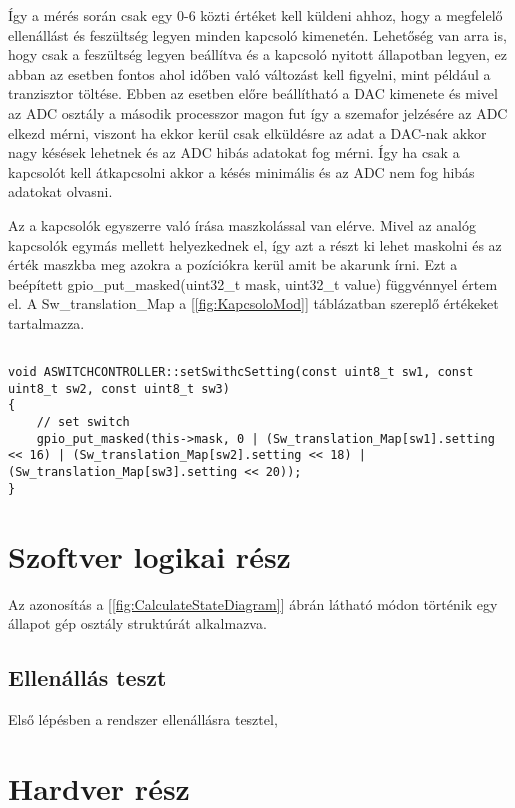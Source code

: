 Így a mérés során csak egy 0-6 közti értéket kell küldeni 
ahhoz, hogy a megfelelő ellenállást és feszültség legyen
minden kapcsoló kimenetén. Lehetőség van arra is, hogy csak 
a feszültség legyen beállítva és a kapcsoló nyitott állapotban legyen,
ez abban az esetben fontos ahol időben való változást kell figyelni,
mint például a tranzisztor töltése. Ebben az esetben előre 
beállítható a DAC kimenete és mivel az ADC osztály a második
processzor magon fut így a szemafor jelzésére az ADC elkezd mérni, 
viszont ha ekkor kerül csak elküldésre az adat a DAC-nak akkor 
nagy késések lehetnek és az ADC hibás adatokat fog mérni.
Így ha csak a kapcsolót kell átkapcsolni akkor a késés minimális és az ADC
nem fog hibás adatokat olvasni.

Az a kapcsolók egyszerre való írása maszkolással van elérve. Mivel az 
analóg kapcsolók egymás mellett helyezkednek el, így azt a 
részt ki lehet maskolni és az érték maszkba meg azokra a pozíciókra
kerül amit be akarunk írni. Ezt a beépített gpio_put_masked(uint32_t mask, uint32_t value)
függvénnyel értem el. A Sw_translation_Map a [\ref{fig:KapcsoloMod}] táblázatban
szereplő értékeket tartalmazza.


\begin{lstlisting}

void ASWITCHCONTROLLER::setSwithcSetting(const uint8_t sw1, const uint8_t sw2, const uint8_t sw3)
{
    // set switch
    gpio_put_masked(this->mask, 0 | (Sw_translation_Map[sw1].setting << 16) | (Sw_translation_Map[sw2].setting << 18) | (Sw_translation_Map[sw3].setting << 20));
}

\end{lstlisting}


\section{Szoftver logikai rész}

Az azonosítás a [\ref{fig:CalculateStateDiagram}] ábrán látható
módon történik egy állapot gép osztály struktúrát alkalmazva.

\subsection{Ellenállás teszt}

Első lépésben a rendszer ellenállásra tesztel, 



\section{Hardver rész}

